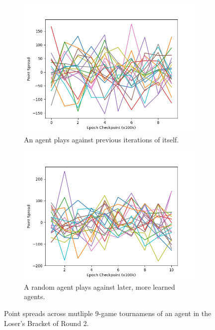 
\begin{figure}
\center

\begin{subfigure}[b]{0.90\textwidth}
	\includegraphics[width=\linewidth]{images/findings/round2/spreads_self-v-prev_loser.png}
	\caption{An agent plays against previous iterations of itself.}
	\label{fig:r2-spreads-loser-a}
\end{subfigure}

\begin{subfigure}[b]{0.90\textwidth}
	\includegraphics[width=\linewidth]{images/findings/round2/spreads_rand-v-fut_loser.png}
	\caption{A random agent plays against later, more learned agents.}
	\label{fig:r2-spreads-loser-b}
\end{subfigure}

\caption{
	Point spreads across mutliple 9-game tournamens of an agent in the
	Loser's Bracket of Round 2.
}
\label{fig:r2-spreads-loser}
\end{figure}
